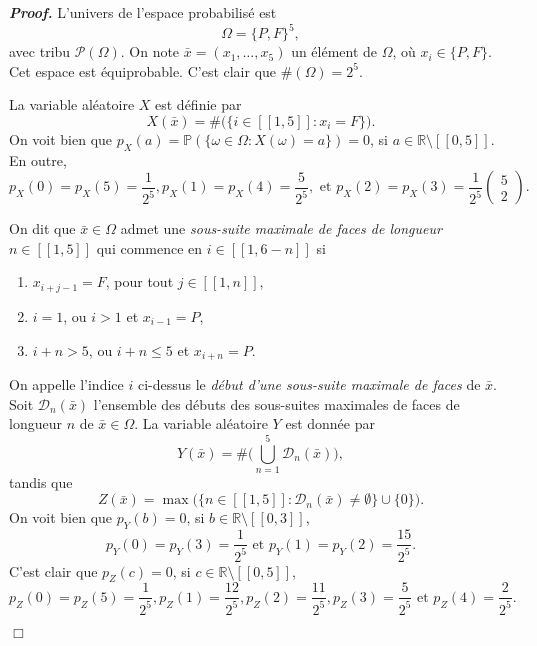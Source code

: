 \documentclass[11pt,a4paper]{article}
\newcommand{\RR}{\mathbb{R}}
\newenvironment{preuve}[1][]
{\vskip 2mm  \noindent\emph{\bf Proof#1. }}{$\Box$ \vskip 2mm}
\let\leq\leqslant
\begin{document}
		\begin{preuve}
			L'univers de l'espace probabilisé est 
			\[     \Omega = \{ P, F \}^{5},     \]
			avec tribu $\mathscr{P}(\Omega)$. 
			On note $\bar{x} = (x_{1},\dots,x_{5})$ un élément de $\Omega$, où $x_{i} \in \{ P, F \}$. 
			Cet espace est équiprobable. 
			C'est clair que $\#(\Omega) = 2^{5}$. 
			
			La variable aléatoire $X$ est définie par 
			\[     X(\bar{x}) = \#\big( \{ i \in [\![ 1,5 ]\!] : x_{i} = F \} \big).     \]
			On voit bien que $p_{X}(a) = \mathbb{P}(\{ \omega \in \Omega : X(\omega) = a\}) = 0$, si $a \in \RR \setminus [\![ 0, 5 ]\!]$. 
			En outre, 
			\[     p_{X}(0) = p_{X}(5) = \frac{1}{2^{5}}, p_{X}(1) = p_{X}(4) = \frac{5}{2^{5}}, \text{ et }  p_{X}(2) = p_{X}(3) = \frac{1}{2^{5}} \begin{pmatrix} 5 \\ 2 \end{pmatrix}.     \]
			
			On dit que $\bar{x} \in \Omega$ admet une \emph{sous-suite maximale de faces de longueur} $n \in [\![ 1,5 ]\!]$ qui commence en $i \in [\![ 1, 6 - n ]\!]$ si
			\begin{enumerate}[label=(\roman*)]
				\item $x_{i+j-1} = F$, pour tout $j \in [\![ 1,n ]\!]$, 
				\item $i=1$, ou $i > 1$ et $x_{i-1} = P$,
				\item $i+n > 5$, ou $i+n \leq 5$ et $x_{i+n} = P$.
			\end{enumerate} 
			On appelle l'indice $i$ ci-dessus le \emph{début d'une sous-suite maximale de faces} de $\bar{x}$. 
			Soit $\mathscr{D}_{n}(\bar{x})$ l'ensemble des débuts des sous-suites maximales de faces de longueur $n$ de $\bar{x} \in \Omega$. 
			La variable aléatoire $Y$ est donnée par 
			\[     Y(\bar{x}) = \#\bigg( \bigcup_{n=1}^{5} \mathscr{D}_{n}(\bar{x}) \bigg),     \]
			tandis que 
			\[     Z(\bar{x}) = \operatorname{max} \bigg(\{ n \in [\![ 1,5 ]\!] : \mathscr{D}_{n}(\bar{x}) \neq \emptyset \} \cup \{ 0 \}\bigg).     \]
			On voit bien que $p_{Y}(b) = 0$, si $b \in \RR \setminus [\![ 0, 3 ]\!]$, 
			\[     p_{Y}(0) = p_{Y}(3) = \frac{1}{2^{5}} \text{ et } p_{Y}(1) = p_{Y}(2) = \frac{15}{2^{5}}.     \]
			C'est clair que $p_{Z}(c) = 0$, si $c \in \RR \setminus [\![ 0, 5 ]\!]$, 
			\[     p_{Z}(0) = p_{Z}(5) = \frac{1}{2^{5}}, p_{Z}(1) = \frac{12}{2^{5}}, p_{Z}(2) = \frac{11}{2^{5}}, p_{Z}(3) = \frac{5}{2^{5}} \text{ et } p_{Z}(4) = \frac{2}{2^{5}}.     \]
			

\end{preuve}
\end{document}
